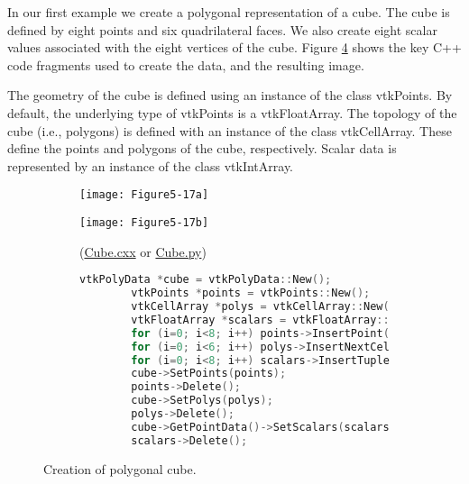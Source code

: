 In our first example we create a polygonal representation of a cube. The cube is defined by eight points and six quadrilateral faces. We also create eight scalar values associated with the eight vertices of the cube. Figure \ref{fig:Figure5-17} shows the key C++ code fragments used to create the data, and the resulting image.

The geometry of the cube is defined using an instance of the class vtkPoints. By default, the underlying type of vtkPoints is a vtkFloatArray. The topology of the cube (i.e., polygons) is defined with an instance of the class vtkCellArray. These define the points and polygons of the cube, respectively. Scalar data is represented by an instance of the class vtkIntArray.

\begin{figure}[!htb]
	\begin{subfigure}[h]{0.48\linewidth}
		\texttt{[image: Figure5-17a]}
		\caption*{}
		\label{fig:Figure5-17a}
	\end{subfigure}
	\hfill
	\begin{subfigure}[h]{0.48\linewidth}
		\texttt{[image: Figure5-17b]}
		\caption*{(\href{https://lorensen.github.io/VTKExamples/site/Cxx/GeometricObjects/Cube/}{Cube.cxx} or \href{https://lorensen.github.io/VTKExamples/site/Python/GeometricObjects/Cube/}{Cube.py})}
		\label{fig:Figure5-17b}
	\end{subfigure}
	\hfill
	\begin{subfigure}[h]{0.96\linewidth}
		\caption*{}
	\end{subfigure}
	\hfill
	\begin{subfigure}[h]{0.96\linewidth}
		\begin{lstlisting}[language=C++, caption={}]
		vtkPolyData *cube = vtkPolyData::New();
		vtkPoints *points = vtkPoints::New();
		vtkCellArray *polys = vtkCellArray::New();
		vtkFloatArray *scalars = vtkFloatArray::New();
		for (i=0; i<8; i++) points->InsertPoint(i,x[i]);
		for (i=0; i<6; i++) polys->InsertNextCell(4,pts[i]);
		for (i=0; i<8; i++) scalars->InsertTuple1(i,i);
		cube->SetPoints(points);
		points->Delete();
		cube->SetPolys(polys);
		polys->Delete();
		cube->GetPointData()->SetScalars(scalars);
		scalars->Delete();
		\end{lstlisting}
		\caption*{}
		\label{fig:Figure5-17c}
	\end{subfigure}
	\caption{Creation of polygonal cube.}\label{fig:Figure5-17}
\end{figure}

